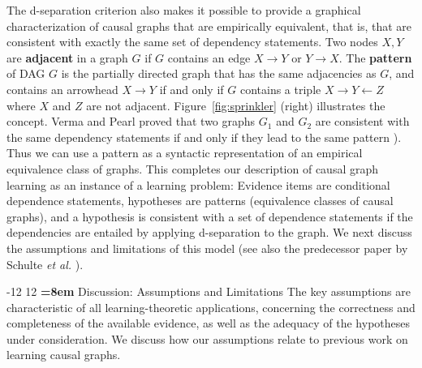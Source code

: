 \documentclass{elsarticle}%
\makeatletter
\renewcommand\section{\@startsection {section}{1}{\z@}%
  {-12\p@ \@plus -4\p@ \@minus -4\p@}%
                       {12\p@ \@plus 4\p@ \@minus 4\p@}%
                                   {\normalfont\large\bfseries\boldmath
                                   \rightskip=\z@ \@plus 8em\pretolerance=10000 }}
\newcommand{\X}{X}
\newcommand{\Y}{Y}
\newcommand{\Z}{Z}
\newcommand{\G}{G}
\makeatother
\begin{document}
The d-separation criterion also makes it possible to provide a graphical characterization of causal graphs that are empirically equivalent, that is, that are consistent with exactly the same set of dependency statements. Two nodes $X,Y$ are {\bf adjacent} in a graph $\G$ if $\G$ contains an edge $\X \rightarrow \Y$ or $\Y \rightarrow \X$. 
The {\bf pattern} of DAG $\G$ is
the partially directed graph that has the same adjacencies as $\G$,
and contains an arrowhead $\X \rightarrow \Y$ if and only if $\G$ contains a
triple $\X \rightarrow \Y \leftarrow \Z$ where $\X$ and $\Z$ are not adjacent. Figure~\ref{fig:sprinkler} (right) illustrates the concept. Verma and Pearl proved that two graphs $\G_1$
and $\G_2$ are consistent with the same dependency statements if and only if they lead to the same pattern
\cite[Thm. 1]{verma90:_equiv_synth_causal_model}). Thus we can use a pattern as a syntactic representation of an empirical equivalence class of graphs. This completes our description of causal graph learning as an instance of a learning problem: Evidence items are conditional dependence statements, hypotheses are patterns (equivalence classes of causal graphs), and a hypothesis is consistent with a set of dependence statements if the dependencies are entailed by applying d-separation to the graph. We next discuss the assumptions and limitations of this model (see also the predecessor paper by Schulte {\em et al.} \cite{Schulte2010}).


\section{Discussion: Assumptions and Limitations}
The key assumptions are characteristic of all learning-theoretic applications, concerning the correctness and completeness of the available evidence, as well as the adequacy of the hypotheses under consideration. We discuss how our assumptions relate to previous work on learning causal graphs.
\end{document}
